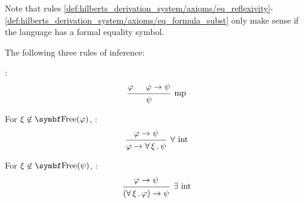 \begin{definition}
\begin{RefList}
    Note that rules \eqref{def:hilberts_derivation_system/axioms/eq_reflexivity}-\eqref{def:hilberts_derivation_system/axioms/eq_formula_subst} only make sense if the language has a formal equality symbol.

     The following three rules of inference:
    \begin{defenum}
       :
      \begin{equation}\label{eq:def:hilberts_derivation_system/rules/modus_ponens}
        \begin{prooftree}
          \hypo{\varphi}
          \hypo{\varphi \to \psi}
          \infer2[mp]{\psi}
        \end{prooftree}
      \end{equation}

       For \( \xi \not\in \bop{Free}(\varphi) \), :
      \begin{equation}\label{eq:def:hilberts_derivation_system/rules/forall_intro}
        \begin{prooftree}
          \hypo{\varphi \to \psi}
          \infer1[\( \forall \) \text{int}]{\varphi \to \qforall{\xi} \psi}
        \end{prooftree}
      \end{equation}

       For \( \xi \not\in \bop{Free}(\psi) \), :
      \begin{equation}\label{eq:def:hilberts_derivation_system/rules/exists_intro}
        \begin{prooftree}
          \hypo{\varphi \to \psi}
          \infer1[\( \exists \) \text{int}]{(\qforall{\xi} \varphi) \to \psi}
        \end{prooftree}
      \end{equation}
    \end{defenum}
  \end{RefList}
\end{definition}

